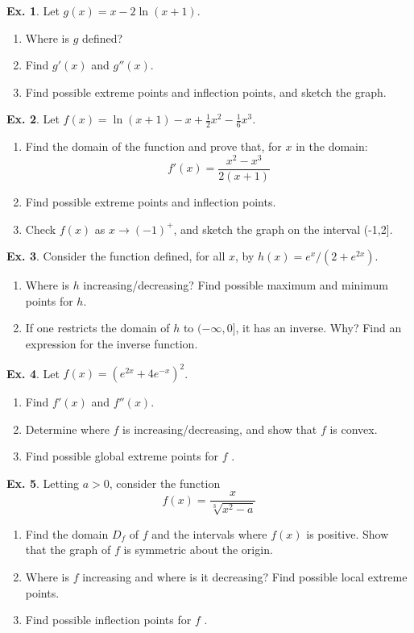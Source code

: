\documentclass[10pt,a4paper]{book}
\theoremstyle{definition}\newtheorem{definition}{Definition}
\theoremstyle{definition}\newtheorem{fact}{Fact}
\theoremstyle{definition}\newtheorem{ex}{Ex.}
\theoremstyle{definition}\newtheorem{project}{Project}
\theoremstyle{definition}\newtheorem{problem}{Problem}
\theoremstyle{definition}\newtheorem{example}{Example}
\numberwithin{theorem}{chapter}
\numberwithin{corollary}{chapter}
\numberwithin{assumption}{chapter}
\numberwithin{definition}{chapter}
\numberwithin{prop}{chapter}
\numberwithin{notation}{chapter}
\numberwithin{problem}{chapter}
\numberwithin{example}{chapter}
\numberwithin{fact}{chapter}
\numberwithin{ex}{chapter}
\begin{document}
	\begin{ex}
		Let $g(x)=x-2\ln (x+1)$.
		\begin{enumerate}[label=(\alph*)]
			\item Where is $g$ defined?
			\item Find $g'(x)$ and $g''(x)$.
			\item Find possible extreme points and inflection points, and sketch the graph.
		\end{enumerate}
	\end{ex}
	
	\begin{ex}
		Let $f(x)=\ln (x+1)-x+\frac{1}{2}x^2-\frac{1}{6}x^3$.
		\begin{enumerate}[label=(\alph*)]
			\item Find the domain of the function and prove that, for $x$ in the domain:
			$$f'(x) = \frac{x^2-x^3}{2(x+1)}$$
			\item Find possible extreme points and inflection points.
			\item Check $f(x)$ as $x \rightarrow (-1)^{+}$, and sketch the graph on the interval (-1,2].
		\end{enumerate}
	\end{ex}
	
	\begin{ex}
		Consider the function defined, for all $x$, by $h(x) = e^x/(2 + e^{2x})$.
		\begin{enumerate}[label=(\alph*)]
			\item Where is $h$ increasing/decreasing? Find possible maximum and minimum points for $h$.
			\item If one restricts the domain of $h$ to $(-\infty, 0]$, it has an inverse. Why? Find an expression for the inverse function.
		\end{enumerate}
	\end{ex}
	
	\begin{ex}
		Let $f(x)=(e^{2x}+4e^{-x})^2$.
		\begin{enumerate}[label=(\alph*)]
			\item Find $f'(x)$ and $f''(x)$.
			\item Determine where $f$ is increasing/decreasing, and show that $f$ is convex.
			\item Find possible global extreme points for $f$ .
		\end{enumerate}
	\end{ex}
	
	\begin{ex}
		Letting $a > 0$, consider the function
		$$f(x) = \frac{x}{\sqrt[3]{x^2-a}}$$
		\begin{enumerate}[label=(\alph*)]
			\item Find the domain $D_f$ of $f$ and the intervals where $f (x)$ is positive. Show that the graph of $f$ is symmetric about the origin.
			\item Where is $f$ increasing and where is it decreasing? Find possible local extreme points.
			\item Find possible inflection points for $f$ .
		\end{enumerate}
	\end{ex}
	
\end{document}
